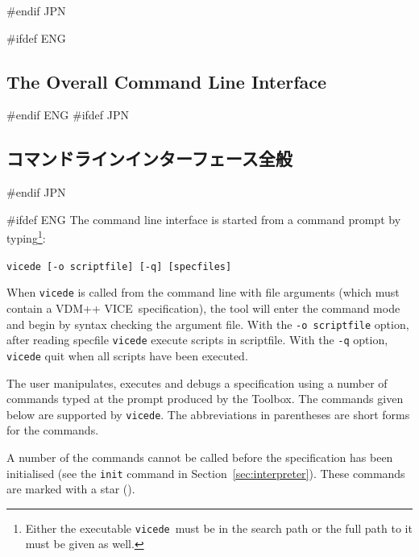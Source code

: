 \documentclass[\pformat,12pt]{article}
\newcommand{\vdmslpp}{VDM-SL}
\newcommand{\Toolbox}{Toolbox}
\newcommand{\vdmde}{vdmde}
\newcommand{\vdmslpp}{VDM++}
\newcommand{\Toolbox}{Toolbox}
\newcommand{\vdmde}{vppde}
\renewcommand{\vdmslpp}{VDM++ VICE}
\renewcommand{\vdmde}{vicede}
\newcommand{\cmd}{\tt }
\newcommand{\guicmd}[1]{{\sf #1}}
\newcommand{\guicmd}[1]{{\gt #1}}
\begin{document}
\begin{description}
#endif JPN
\end{description}


#ifdef ENG
\subsection{The Overall Command Line Interface}\label{subsec:maincommand}
#endif ENG
#ifdef JPN
\subsection{コマンドラインインターフェース全般}\label{subsec:maincommand}
#endif JPN

#ifdef ENG
The command line interface is started from a command prompt by
typing\footnote{Either the executable {\tt \vdmde}\ must be in the
  search path or the full path to it must be given as well.}:

{\tt \vdmde\ [-o scriptfile] [-q] [specfiles]}

When {\tt \vdmde} is called from the command line 
with file arguments (which must contain a \vdmslpp\ 
specification), the tool will enter the command mode and begin by
syntax checking the argument file.
With the {\tt -o scriptfile} option, after reading specfile {\tt \vdmde}
execute scripts in scriptfile. With the {\tt -q} option, {\tt \vdmde} quit
when all scripts have been executed.

The user manipulates, executes and debugs a specification using a
number of commands typed at the prompt produced by the \Toolbox.  The
commands given below are supported by {\tt \vdmde}.  The abbreviations
in parentheses are short forms for the commands.

A number of the commands cannot be called before the specification has
been initialised (see the {\cmd init} command in
Section~\ref{sec:interpreter}).  These commands are marked with a star
({\tt *}).
\end{document}
